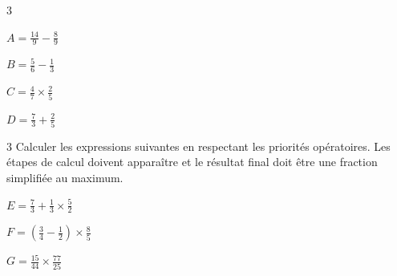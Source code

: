 \documentclass[a4paper]{book}
\begin{document}
{\begin{exerciceNote}{3}
        \smallskip
        \begin{minipage}[t]{0.23\textwidth}
            $A = \frac{14}{9} - \frac{8}{9}$
            \vspace{3cm}
        \end{minipage}\hfill \vline \hfill
        \begin{minipage}[t]{0.23\textwidth}
            $B = \frac{5}{6} - \frac{1}{3}$
            \vspace{3cm}
        \end{minipage}\hfill \vline \hfill
        \begin{minipage}[t]{0.23\textwidth}
            $C = \frac{4}{7} \times \frac{2}{5}$
            \vspace{3cm}
        \end{minipage}\hfill \vline \hfill
        \begin{minipage}[t]{0.23\textwidth}
            $D = \frac{7}{3}+\frac{2}{5}$
            \vspace{3cm}
        \end{minipage}
    \end{exerciceNote}


\newpage

    
    \begin{exerciceNote}{3}
        Calculer les expressions suivantes en respectant les priorités opératoires. Les étapes de calcul doivent apparaître et le résultat final doit être une fraction simplifiée au maximum.
        
        \vspace{0.5cm}
        \begin{minipage}[t]{0.31\textwidth}
            $E = \frac{7}{3} + \frac{1}{3} \times \frac{5}{2}$
            \vspace{4cm}
        \end{minipage}\hfill \vline \hfill
        \begin{minipage}[t]{0.31\textwidth}
            $F = \left( \frac{3}{4} - \frac{1}{2} \right) \times \frac{8}{5}$
            \vspace{4cm}
        \end{minipage}\hfill \vline \hfill
        \begin{minipage}[t]{0.31\textwidth}
            $G = \frac{15}{44} \times \frac{77}{25}$ \\
            \vspace{4cm}
        \end{minipage}
    \end{exerciceNote}
    
}
\end{document}
